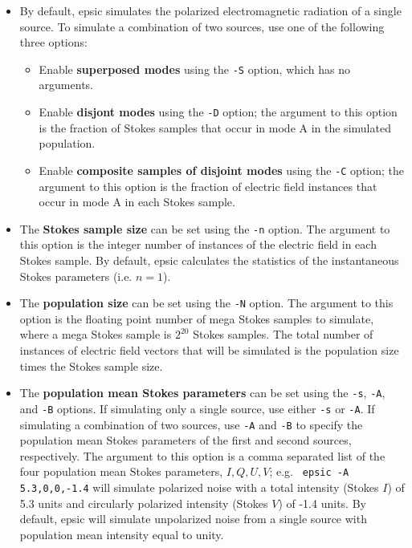 \documentclass[12pt]{article}
\begin{document}
\begin{itemize}

\item By default, {\sc epsic} simulates the polarized electromagnetic
  radiation of a single source.  To simulate a combination of two
  sources, use one of the following three options:

  \begin{itemize}
  \item Enable {\bf superposed modes} using the {\tt -S} option, which
    has no arguments.

  \item Enable {\bf disjont modes} using the {\tt -D} option; the argument
    to this option is the fraction of Stokes samples that occur in mode A
    in the simulated population.

  \item Enable {\bf composite samples of disjoint modes} using the
    {\tt -C} option; the argument to this option is the fraction of
    electric field instances that occur in mode A in each Stokes sample.

  \end{itemize}

\item The {\bf Stokes sample size} can be set using the {\tt -n}
  option.  The argument to this option is the integer number of
  instances of the electric field in each Stokes sample.  By default,
  {\sc epsic} calculates the statistics of the instantaneous Stokes
  parameters (i.e. $n=1$).

\item The {\bf population size} can be set using the {\tt -N}
  option.  The argument to this option is the floating point number
  of mega Stokes samples to simulate, where a mega Stokes sample is
  $2^{20}$ Stokes samples.  The total number of instances of electric
  field vectors that will be simulated is the population size times
  the Stokes sample size.
   
\item The {\bf population mean Stokes parameters} can be set using the
  {\tt -s}, {\tt -A}, and {\tt -B} options.  If simulating only a
  single source, use either {\tt -s} or {\tt -A}.  If simulating a
  combination of two sources, use {\tt -A} and {\tt -B} to specify the
  population mean Stokes parameters of the first and second sources,
  respectively.  The argument to this option is a comma separated list
  of the four population mean Stokes parameters, $I,Q,U,V$; e.g.  {\tt
    epsic -A 5.3,0,0,-1.4} will simulate polarized noise with a total
  intensity (Stokes $I$) of 5.3 units and circularly polarized
  intensity (Stokes $V$) of -1.4 units.  By default, {\sc epsic} will
  simulate unpolarized noise from a single source with population mean
  intensity equal to unity.
  

\end{itemize}
\end{document}
